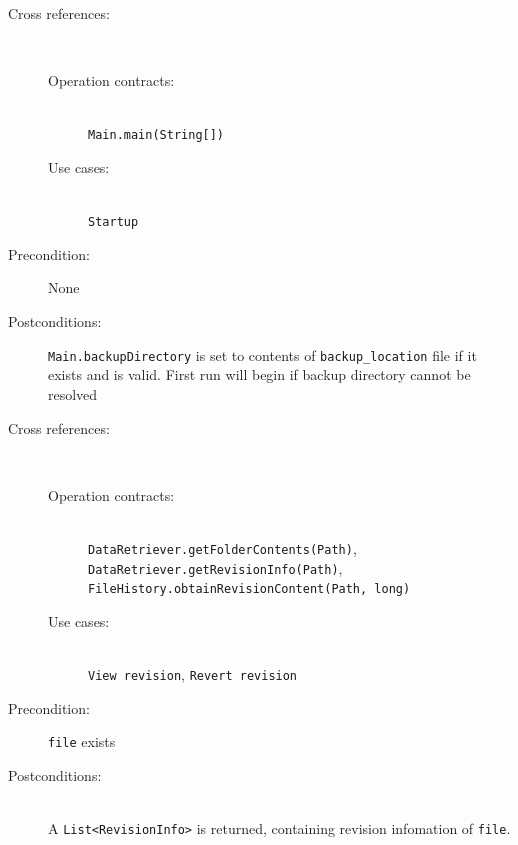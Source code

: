 \documentclass[12pt,a4paper]{article}
\begin{document}
\begin{description}
	\item[Cross references:] \hfill \vspace{-4ex}  \\
		\begin{description} 
		\item[Operation contracts:] \hfill \\
			\texttt{Main.main(String[])}
		\item[Use cases:] \hfill \\
			\texttt{Startup}
	\end{description}
	\item[Precondition:] None
	\item[Postconditions:] \texttt{Main.backupDirectory} is set to contents of \texttt{backup\_{}location} file if it exists and is valid. First run will begin if backup directory cannot be resolved
\end{description}

\vspace{0.75cm}

	\begin{description}
	\item[Cross references:] \hfill \vspace{-4ex}  \\
		\begin{description} 
		\item[Operation contracts:] \hfill \\
			\texttt{DataRetriever.getFolderContents(Path)},\\
			\texttt{DataRetriever.getRevisionInfo(Path)},\\
			\texttt{FileHistory.obtainRevisionContent(Path, long)}
		\item[Use cases:] \hfill \\
			\texttt{View revision}, \texttt{Revert revision}
	\end{description}
	\item[Precondition:] \texttt{file} exists
	\item[Postconditions:] \hfill \\
	A \texttt{List<RevisionInfo>} is returned, containing revision infomation of \texttt{file}.
\end{description}

\vspace{0.75cm}
\end{document}
